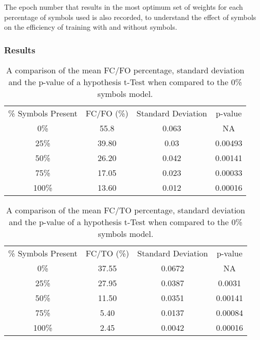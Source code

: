 The epoch number that results in the most optimum set of weights for each percentage of symbols used is also recorded, to understand the effect of symbols on the efficiency of training with and without symbols.

\subsubsection{Results}

\begin{table}[p]
	\center
	\caption{A comparison of the mean FC/FO percentage, standard deviation and the p-value of a hypothesis t-Test when compared to the 0\% symbols model.}
	\label{tab:experiment-3-results-table-fcfo}
	\begin{tabular}{ |c|c|c|c| } 
		\hline
		\% Symbols Present & FC/FO (\%) & Standard Deviation  & p-value\\ 
		0\% & 55.8 & 0.063 & NA \\  
		25\% & 39.80 & 0.03 & 0.00493\\  
		50\% & 26.20 & 0.042 & 0.00141 \\  
		75\% & 17.05 & 0.023 & 0.00033\\  
		100\% & 13.60 & 0.012 & 0.00016\\  
		\hline
	\end{tabular}
\end{table}

\begin{table}[p]
	\center
	\caption{A comparison of the mean FC/TO percentage, standard deviation and the p-value of a hypothesis t-Test when compared to the 0\% symbols model.}
	\label{tab:experiment-3-results-table-fcto}
	\begin{tabular}{ |c|c|c|c| } 
		\hline
		\% Symbols Present & FC/TO (\%) & Standard Deviation  & p-value\\ 
		0\% & 37.55 & 0.0672 & NA \\  
		25\% & 27.95 & 0.0387 & 0.0031\\  
		50\% & 11.50 & 0.0351 & 0.00141 \\  
		75\% & 5.40 & 0.0137 & 0.00084\\  
		100\% & 2.45 & 0.0042 & 0.00016\\  
		\hline
	\end{tabular}
\end{table}

